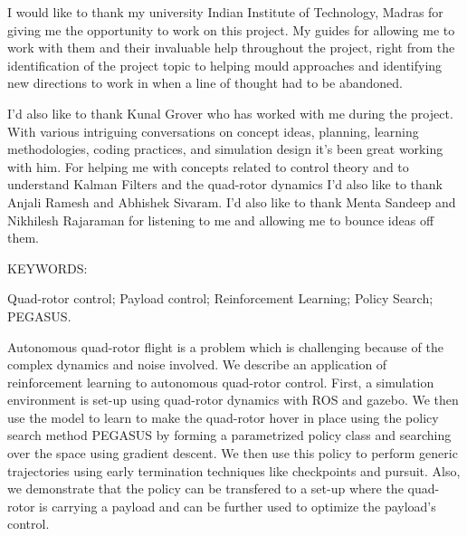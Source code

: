 \documentclass[hidelinks,BTech]{iitmdiss}
\begin{document}
\acknowledgements

I would like to thank my university Indian Institute of Technology, Madras for giving me the opportunity to work on this project. My guides for allowing me to work with them and their invaluable help throughout the project, right from the identification of the project topic to helping mould approaches and identifying new directions to work in when a line of thought had to be abandoned.

I'd also like to thank Kunal Grover who has worked with me during the project. With various intriguing conversations on concept ideas, planning, learning methodologies, coding practices, and simulation design it's been great working with him. For helping me with concepts related to control theory and to understand Kalman Filters and the quad-rotor dynamics I'd also like to thank Anjali Ramesh and Abhishek Sivaram. I'd also like to thank Menta Sandeep and Nikhilesh Rajaraman for listening to me and allowing me to bounce ideas off them.


\abstract

\noindent KEYWORDS: \hspace*{0.5em} \parbox[t]{4.4in}{Quad-rotor control; Payload control; Reinforcement Learning; Policy Search; PEGASUS.}

\vspace*{24pt}

\noindent Autonomous quad-rotor flight is a problem which is challenging because of the complex dynamics and noise involved. We describe an application of reinforcement learning to autonomous quad-rotor control. First, a simulation environment is set-up using quad-rotor dynamics with ROS and gazebo. We then use the model to learn to make the quad-rotor hover in place using the policy search method PEGASUS by forming a parametrized policy class and searching over the space using gradient descent. We then use this policy to perform generic trajectories using early termination techniques like checkpoints and pursuit. Also, we demonstrate that the policy can be transfered to a set-up where the quad-rotor is carrying a payload and can be further used to optimize the payload's control.

\pagebreak

\end{document}
